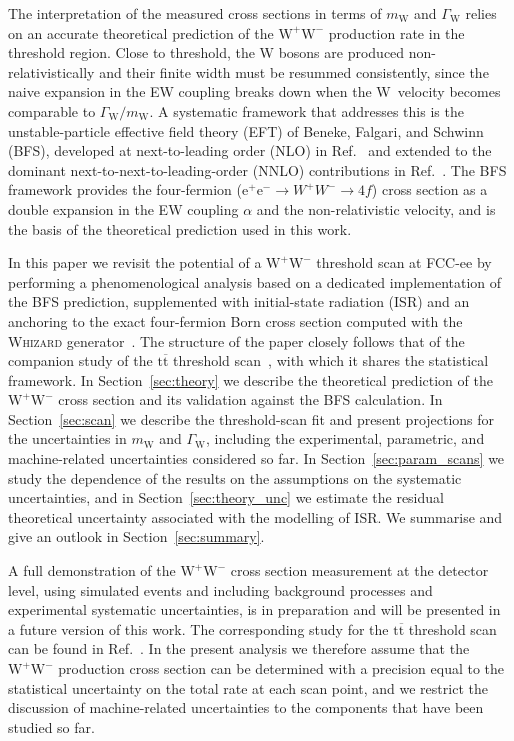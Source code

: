 \documentclass[a4paper,11pt]{article}
\newcommand{\ttbar}{\ensuremath{\mathrm{t\overline{t}}}\xspace}
\newcommand{\WW}{\ensuremath{\mathrm{W^+W^-}}\xspace}
\newcommand{\mW}{\ensuremath{m_\mathrm{W}}\xspace}
\newcommand{\GW}{\ensuremath{\Gamma_\mathrm{W}}\xspace}
\newcommand{\epm}{\ensuremath{\mathrm{e^+e^-}}\xspace}
\begin{document}
The interpretation of the measured cross sections in terms of \mW and \GW
relies on an accurate theoretical prediction of the \WW production rate
in the threshold region. Close to threshold, the W bosons are produced
non-relativistically and their finite width must be resummed
consistently, since the naive expansion in the EW coupling breaks down
when the W~velocity becomes comparable to $\GW/\mW$. A systematic
framework that addresses this is the unstable-particle effective field
theory (EFT) of Beneke, Falgari, and Schwinn (BFS), developed at
next-to-leading order (NLO) in
Ref.~\cite{Beneke:2007zg} and extended to the dominant
next-to-next-to-leading-order (NNLO) contributions in
Ref.~\cite{Actis:2008rb}. The BFS framework provides the four-fermion
($\epm\to W^+W^-\to 4f$) cross section as a double expansion in the EW
coupling $\alpha$ and the non-relativistic velocity, and is the basis of
the theoretical prediction used in this work.

In this paper we revisit the potential of a \WW threshold scan at FCC-ee
by performing a phenomenological analysis based on a dedicated
implementation of the BFS prediction, supplemented with initial-state
radiation (ISR) and an anchoring to the exact four-fermion Born cross
section computed with the \textsc{Whizard}
generator~\cite{Kilian:2007gr}. The structure of the paper closely
follows that of the companion study of the \ttbar threshold
scan~\cite{Defranchis:2025hfh}, with which it shares the statistical
framework. In Section~\ref{sec:theory} we describe the theoretical
prediction of the \WW cross section and its validation against the BFS
calculation. In Section~\ref{sec:scan} we describe the threshold-scan
fit and present projections for the uncertainties in \mW and \GW,
including the experimental, parametric, and machine-related uncertainties
considered so far. In Section~\ref{sec:param_scans} we study the
dependence of the results on the assumptions on the systematic
uncertainties, and in Section~\ref{sec:theory_unc} we estimate the
residual theoretical uncertainty associated with the modelling of ISR.
We summarise and give an outlook in Section~\ref{sec:summary}.

A full demonstration of the \WW cross section measurement at the
detector level, using simulated events and including background
processes and experimental systematic uncertainties, is in preparation
and will be presented in a future version of this work. The
corresponding study for the \ttbar threshold scan can be found in
Ref.~\cite{Defranchis:2025hfh}. In the present analysis we therefore
assume that the \WW production cross section can be determined with a
precision equal to the statistical uncertainty on the total rate at each
scan point, and we restrict the discussion of machine-related
uncertainties to the components that have been studied so far.
\end{document}
